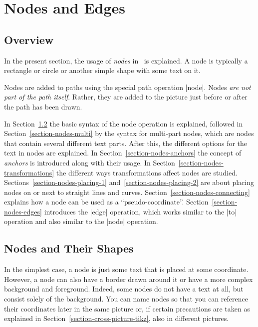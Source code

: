 %
%
%


\section{Nodes and Edges}
\label{section-nodes}

\subsection{Overview}

In the present section, the usage of \emph{nodes} in \tikzname\ is explained. A
node is typically a rectangle or circle or another simple shape with some text
on it.

Nodes are added to paths using the special path operation |node|. Nodes
\emph{are not part of the path itself}. Rather, they are added to the picture
just before or after the path has been drawn.

In Section~\ref{section-nodes-basic} the basic syntax of the node operation is
explained, followed in Section~\ref{section-nodes-multi} by the syntax for
multi-part nodes, which are nodes that contain several different text parts.
After this, the different options for the text in nodes are explained. In
Section~\ref{section-nodes-anchors} the concept of \emph{anchors} is introduced
along with their usage. In Section~\ref{section-nodes-transformations} the
different ways transformations affect nodes are studied.
Sections~\ref{section-nodes-placing-1} and~\ref{section-nodes-placing-2} are
about placing nodes on or next to straight lines and curves.
Section~\ref{section-nodes-connecting} explains how a node can be used as a
``pseudo-coordinate''. Section~\ref{section-nodes-edges} introduces the |edge|
operation, which works similar to the |to| operation and also similar to the
|node| operation.


\subsection{Nodes and Their Shapes}
\label{section-nodes-basic}

In the simplest case, a node is just some text that is placed at some
coordinate. However, a node can also have a border drawn around it or have a
more complex background and foreground. Indeed, some nodes do not have a text
at all, but consist solely of the background. You can name nodes so that you
can reference their coordinates later in the same picture or, if certain
precautions are taken as explained in Section~\ref{section-cross-picture-tikz},
also in different pictures.

